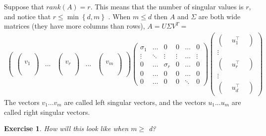 \documentclass[11pt, oneside]{article}   	%
\newtheorem{exercise}{Exercise}
\begin{document}
Suppose that $rank\left(A\right)=r$. This means that the number of singular values is $r$, and notice that $r\le\min\left\{ d,m\right\}$ . When $m\le d$ then $A$ and $\Sigma$ are both wide matrices (they have more columns than rows), $A=U\Sigma V^{T}=$
\begin{eqnarray*}
\left(\begin{array}{ccccc}
\left(\begin{array}{c}
\\
\\
v_{1}\\
\\
\\
\end{array}\right) & ... & \left(\begin{array}{c}
\\
\\
v_{r}\\
\\
\\
\end{array}\right) & ... & \left(\begin{array}{c}
\\
\\
v_{m}\\
\\
\\
\end{array}\right)\end{array}\right)\left(\begin{array}{cccccc}
\sigma_{1} & \ldots & 0 & 0 & \ldots & 0\\
\vdots & \ddots & \vdots & \vdots & \ldots & \vdots\\
0 & \ldots & \sigma_{r} & 0 & \ldots & 0\\
0 & \ldots & 0 & 0 & \ldots & 0\\
0 & \ldots & 0 & 0 & \ddots & 0
\end{array}\right)\left(\begin{array}{c}
\left(\begin{array}{ccccc}
 & u_{1}^{\top} & \end{array}\right)\\
\vdots\\
\left(\begin{array}{ccccc}
 & u_{r}^{\top} & \end{array}\right)\\
\vdots\\
\left(\begin{array}{ccccc}
 &  u_{d}^{\top}& \end{array}\right)
\end{array}\right)
\end{eqnarray*}
The vectors $v_1...v_m$ are called left singular vectors, and the vectors $u_1...u_m$ are called right singular vectors.
\begin{exercise}
How will this look like when $m\ge$ d?
\end{exercise}
\end{document}
